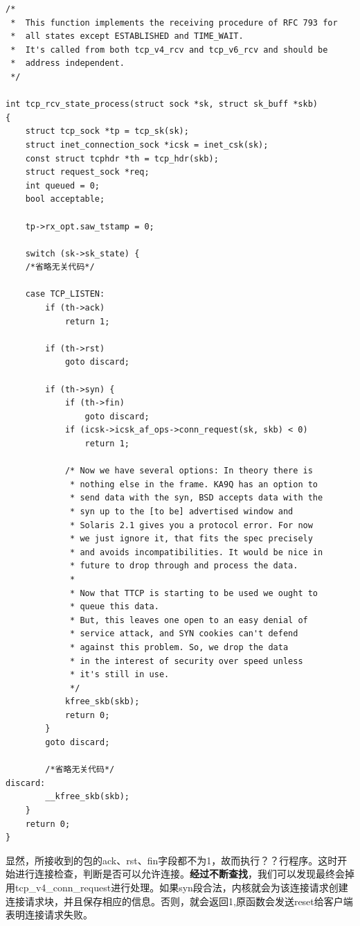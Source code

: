 \begin{verbatim}
/*
 *  This function implements the receiving procedure of RFC 793 for
 *  all states except ESTABLISHED and TIME_WAIT.
 *  It's called from both tcp_v4_rcv and tcp_v6_rcv and should be
 *  address independent.
 */

int tcp_rcv_state_process(struct sock *sk, struct sk_buff *skb)
{
    struct tcp_sock *tp = tcp_sk(sk);
    struct inet_connection_sock *icsk = inet_csk(sk);
    const struct tcphdr *th = tcp_hdr(skb);
    struct request_sock *req;
    int queued = 0;
    bool acceptable;

    tp->rx_opt.saw_tstamp = 0;

    switch (sk->sk_state) {
    /*省略无关代码*/

    case TCP_LISTEN:
        if (th->ack)
            return 1;

        if (th->rst)
            goto discard;

        if (th->syn) {
            if (th->fin)
                goto discard;
            if (icsk->icsk_af_ops->conn_request(sk, skb) < 0)
                return 1;

            /* Now we have several options: In theory there is
             * nothing else in the frame. KA9Q has an option to
             * send data with the syn, BSD accepts data with the
             * syn up to the [to be] advertised window and
             * Solaris 2.1 gives you a protocol error. For now
             * we just ignore it, that fits the spec precisely
             * and avoids incompatibilities. It would be nice in
             * future to drop through and process the data.
             *
             * Now that TTCP is starting to be used we ought to
             * queue this data.
             * But, this leaves one open to an easy denial of
             * service attack, and SYN cookies can't defend
             * against this problem. So, we drop the data
             * in the interest of security over speed unless
             * it's still in use.
             */
            kfree_skb(skb);
            return 0;
        }
        goto discard;

        /*省略无关代码*/
discard:
        __kfree_skb(skb);
    }
    return 0;
}
\end{verbatim}

                显然，所接收到的包的ack、rst、fin字段都不为1，故而执行？？行程序。这时开始进行连接检查，判断是否可以允许连接。\textbf{经过不断查找}，我们可以发现最终会掉用tcp\_v4\_conn\_request进行处理。如果syn段合法，内核就会为该连接请求创建连接请求块，并且保存相应的信息。否则，就会返回1,原函数会发送reset给客户端表明连接请求失败。

